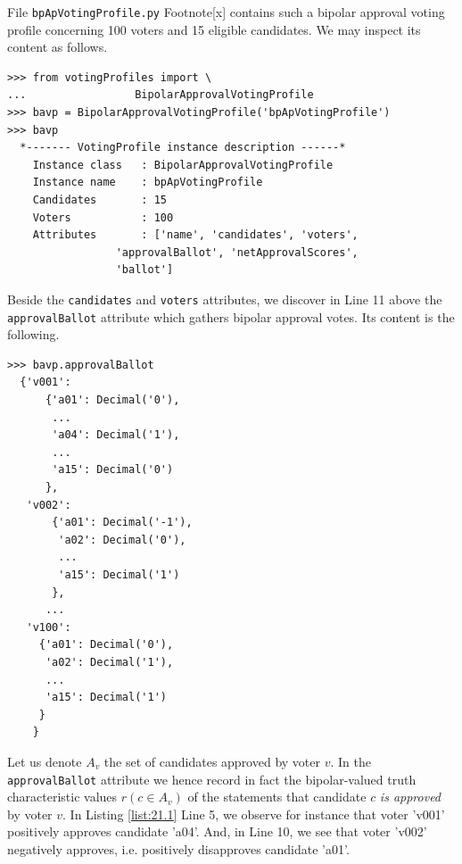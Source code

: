 File \texttt{bpApVotingProfile.py} Footnote[x] contains such a bipolar approval voting profile concerning 100 voters and 15 eligible candidates. We may inspect its content as follows.
\begin{lstlisting}
>>> from votingProfiles import \
...                 BipolarApprovalVotingProfile
>>> bavp = BipolarApprovalVotingProfile('bpApVotingProfile')
>>> bavp
  *------- VotingProfile instance description ------*
    Instance class   : BipolarApprovalVotingProfile
    Instance name    : bpApVotingProfile
    Candidates       : 15
    Voters           : 100
    Attributes       : ['name', 'candidates', 'voters',
                 'approvalBallot', 'netApprovalScores',
                 'ballot']
\end{lstlisting}
Beside the \texttt{candidates} and \texttt{voters} attributes, we discover in Line 11 above the \texttt{approvalBallot} attribute which gathers bipolar approval votes. Its content is the following.
\begin{lstlisting}[caption={Inspecting a bipolar approval ballot},label=list:21.1]
>>> bavp.approvalBallot
  {'v001':
      {'a01': Decimal('0'),
       ...
       'a04': Decimal('1'),
       ...
       'a15': Decimal('0')
      },
   'v002':
       {'a01': Decimal('-1'),
        'a02': Decimal('0'),
        ...
        'a15': Decimal('1')
       },
      ...
   'v100':
     {'a01': Decimal('0'),
      'a02': Decimal('1'),
      ...
      'a15': Decimal('1')
     }
    }
\end{lstlisting}	
Let us denote $A_v$ the set of candidates approved by voter $v$. In the \texttt{approvalBallot} attribute we hence record in fact the bipolar-valued truth characteristic values $r(c \in A_v)$ of the statements that candidate $c$ \emph{is approved} by voter $v$. In Listing \ref{list:21.1} Line 5, we observe for instance that voter 'v001' positively approves candidate 'a04'. And, in Line 10, we see that voter 'v002' negatively approves, i.e. positively disapproves candidate 'a01'.

